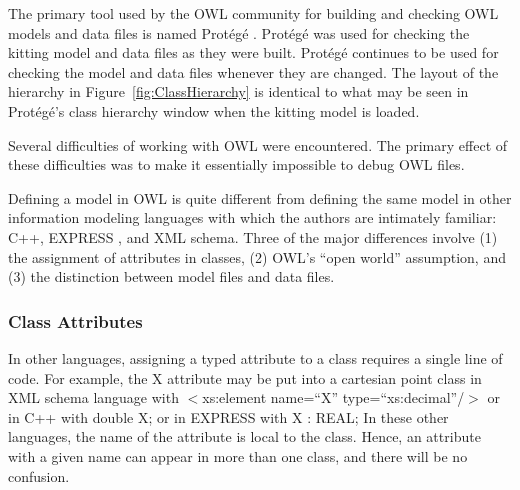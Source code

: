 The primary tool used by the OWL community for building and checking OWL
models and data files is named Prot\'{e}g\'{e} \cite{Horridge.2011}.  Prot\'{e}g\'{e} was
used for checking the kitting model and data files as they were
built.  Prot\'{e}g\'{e} continues to be used for checking the model and data files
whenever they are changed. The layout of the hierarchy in
Figure~\ref{fig:ClassHierarchy} is identical to what may be seen in
 Prot\'{e}g\'{e}'s class hierarchy window when the kitting model is loaded.

Several difficulties of working with OWL were encountered. The primary
effect of these difficulties was to make it essentially impossible to
debug OWL files.

Defining a model in OWL is quite different from defining the same model in
other information modeling languages with which the authors are intimately
familiar: C++, EXPRESS \cite{EXPRESSmanual}, and XML schema. Three of the
major differences involve (1) the assignment of attributes in classes, (2)
OWL's ``open world'' assumption, and (3) the distinction between model
files and data files.\\

\subsubsection{Class Attributes}
In other languages, assigning a typed attribute to a class requires a
single line of code. For example, the X attribute may be put into a
cartesian point class in XML schema language with
\newline \sf $<$xs:element name=``X'' type=``xs:decimal''/$>$\rm
\newline or in C++ with
\newline \sf double X; \rm
\newline or in EXPRESS with
\newline \sf X : REAL; \rm \newline
In these other languages, the name of the attribute is local to the class.
Hence, an attribute with a given name can appear in more than one class, and
there will be no confusion.

